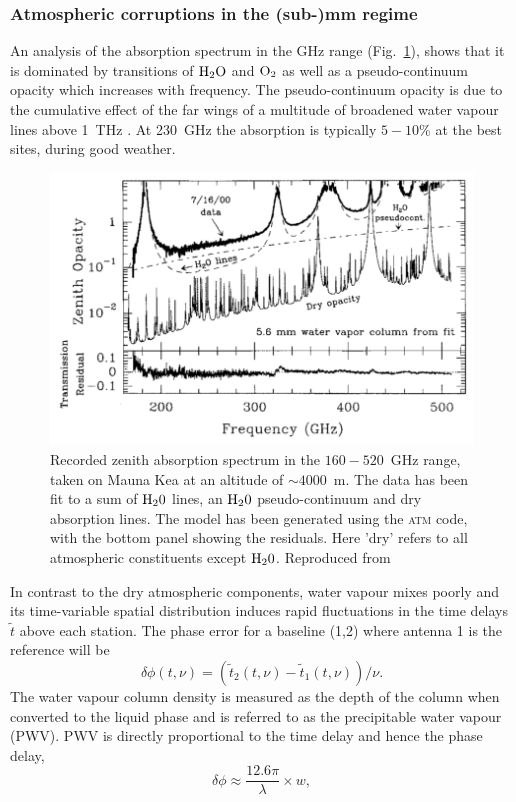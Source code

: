 \subsubsection{Atmospheric corruptions in the (sub-)mm regime}
An analysis of the absorption spectrum in the GHz range (Fig.~\ref{fig:absorption}), shows that it is dominated by transitions of $\rm H_2O$ and $\rm O_2$ as well as a pseudo-continuum opacity which increases with frequency. The pseudo-continuum opacity is due to the cumulative effect of the far wings of a multitude of broadened water vapour lines above 1~THz \citep{Carilli_1999}. At 230~GHz the absorption is typically $5-10$\% at the best sites, during good weather. 

\begin{figure}
\begin{center}
\includegraphics[width=\columnwidth]{Images/absorption}
\caption{Recorded zenith absorption spectrum in the $160-520$~GHz range, taken on Mauna Kea at an altitude of $\sim 4000$~m. The data has been fit to a sum of $\rm H_20$ lines, an $\rm H_20$ pseudo-continuum and dry absorption lines. The model has been generated using the \textsc{atm} code, with the bottom panel showing the residuals. Here 'dry' refers to all atmospheric constituents except $\rm H_20$. Reproduced from \citet{Pardo_2001} \label{fig:absorption}
}
\end{center}
\end{figure}

In contrast to the dry atmospheric components, water vapour mixes poorly and its time-variable spatial distribution induces rapid fluctuations in the time delays $\tilde{t}$ above each station. The phase error for a baseline (1,2) where antenna 1 is the reference will be
\begin{equation}
\delta \phi(t, \nu) = (\tilde{t}_2(t, \nu) - \tilde{t}_1(t, \nu))/\nu.
\end{equation}
The water vapour column density is measured as the depth of the column when converted to the liquid phase and is referred to as the precipitable water vapour (PWV). PWV is directly proportional to the time delay and hence the phase delay, 
\begin{equation}
\delta\phi \approx \frac{12.6\pi}{\lambda} \times w, 
\end{equation}\label{eq:phi-pwv}

